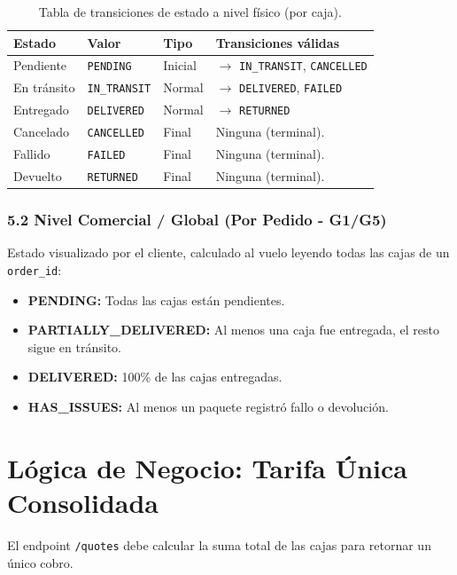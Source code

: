 \documentclass[11pt, a4paper]{article}
\begin{document}
\begin{table}[h!]
\centering
\renewcommand{\arraystretch}{1.3}
\begin{tabularx}{\textwidth}{l l l X}
  \toprule
  \textbf{Estado} & \textbf{Valor} & \textbf{Tipo} & \textbf{Transiciones válidas} \\
  \midrule
  Pendiente   & \texttt{PENDING}     & Inicial & $\rightarrow$ \texttt{IN\_TRANSIT}, \texttt{CANCELLED} \\
  En tránsito & \texttt{IN\_TRANSIT} & Normal  & $\rightarrow$ \texttt{DELIVERED}, \texttt{FAILED} \\
  Entregado   & \texttt{DELIVERED}   & Normal  & $\rightarrow$ \texttt{RETURNED} \\
  Cancelado   & \texttt{CANCELLED}   & Final   & Ninguna (terminal). \\
  Fallido     & \texttt{FAILED}      & Final   & Ninguna (terminal). \\
  Devuelto    & \texttt{RETURNED}    & Final   & Ninguna (terminal). \\
  \bottomrule
\end{tabularx}
\caption{Tabla de transiciones de estado a nivel físico (por caja).}
\end{table}

\subsubsection{5.2 Nivel Comercial / Global (Por Pedido - G1/G5)}
Estado visualizado por el cliente, calculado al vuelo leyendo todas las cajas de un \texttt{order\_id}:
\begin{itemize}[noitemsep]
  \item \textbf{PENDING:} Todas las cajas están pendientes.
  \item \textbf{PARTIALLY\_DELIVERED:} Al menos una caja fue entregada, el resto sigue en tránsito.
  \item \textbf{DELIVERED:} 100\% de las cajas entregadas.
  \item \textbf{HAS\_ISSUES:} Al menos un paquete registró fallo o devolución.
\end{itemize}




\section{Lógica de Negocio: Tarifa Única Consolidada}

El endpoint \texttt{/quotes} debe calcular la suma total de las cajas para retornar un único cobro.
\end{document}
